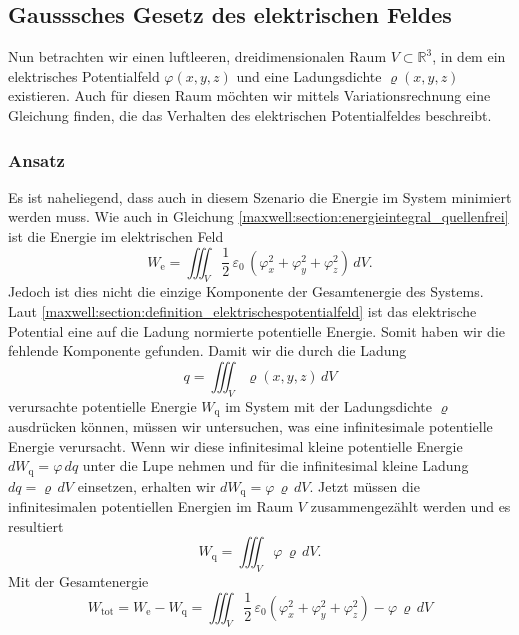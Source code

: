 %
%
%
%
\subsection{Gausssches Gesetz des elektrischen Feldes
\label{maxwell:section:elektrostatik_mit_quelle}}
Nun betrachten wir einen luftleeren, dreidimensionalen Raum $V\subset\mathbb{R}^3$, in dem ein elektrisches Potentialfeld $\varphi(x,y,z)$ und eine Ladungsdichte $\varrho(x,y,z)$ existieren.
Auch für diesen Raum möchten wir mittels Variationsrechnung eine Gleichung finden, die das Verhalten des elektrischen Potentialfeldes beschreibt.

\subsubsection{Ansatz}
Es ist naheliegend, dass auch in diesem Szenario die Energie im System minimiert werden muss.
Wie auch in Gleichung \eqref{maxwell:section:energieintegral_quellenfrei} ist die Energie im elektrischen Feld
\[
W_{\text{e}}
=
\iiint_V \frac{1}{2}\,\varepsilon_0\,(\varphi_x^2 + \varphi_y^2 + \varphi_z^2)\, dV.
\]
Jedoch ist dies nicht die einzige Komponente der Gesamtenergie des Systems.
Laut \eqref{maxwell:section:definition_elektrischespotentialfeld} ist das elektrische Potential eine auf die Ladung normierte potentielle Energie.
Somit haben wir die fehlende Komponente gefunden.
Damit wir die durch die Ladung
\begin{equation}
q
=
\iiint_V \varrho(x,y,z)\, dV
\label{maxwell:ladung}
\end{equation}
verursachte potentielle Energie $W_{\text{q}}$ im System mit der Ladungsdichte $\varrho$ ausdrücken können, müssen wir untersuchen, was eine infinitesimale potentielle Energie verursacht.
Wenn wir diese infinitesimal kleine potentielle Energie
\(
dW_{\text{q}}
=
\varphi\, dq
\)
unter die Lupe nehmen und für die infinitesimal kleine Ladung
\(
dq
=
\varrho\, dV
\)
einsetzen, erhalten wir
\(
dW_{\text{q}}
=
\varphi\,\varrho\, dV.
\)
Jetzt müssen die infinitesimalen potentiellen Energien im Raum $V$ zusammengezählt werden und es resultiert
\begin{equation}
W_{\text{q}}
=
\iiint_V \varphi\,\varrho\, dV.
\label{maxwell:section:potenzielle_energie_ladung}
\end{equation}
Mit der Gesamtenergie
\[
W_{\text{tot}}
=
W_{\text{e}} - W_{\text{q}}
=
\iiint_V \frac{1}{2}\,\varepsilon_0\left(\varphi_x^2 + \varphi_y^2 + \varphi_z^2\right) - \varphi\,\varrho\, dV
\]
